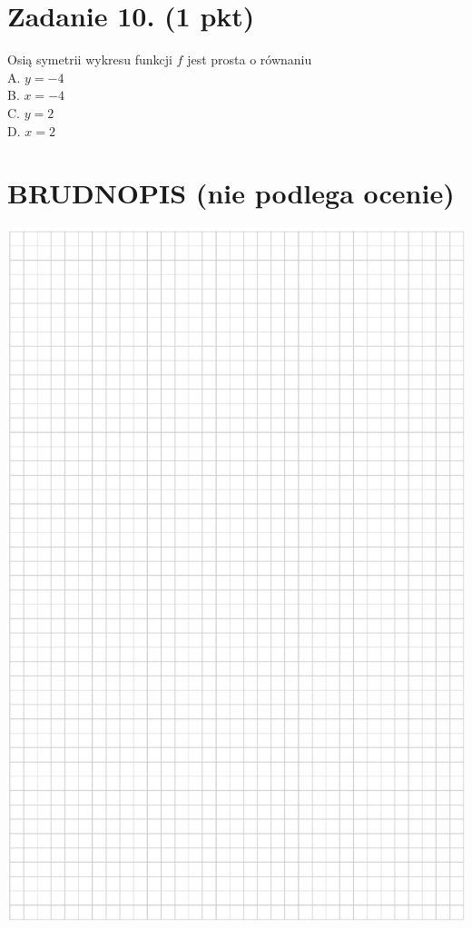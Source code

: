 \documentclass[10pt]{article}
\begin{document}
\section*{Zadanie 10. (1 pkt)}
Osią symetrii wykresu funkcji \(f\) jest prosta o równaniu\\
A. \(y=-4\)\\
B. \(x=-4\)\\
C. \(y=2\)\\
D. \(x=2\)

\section*{BRUDNOPIS (nie podlega ocenie)}
\begin{center}
\includegraphics[max width=\textwidth]{2024_11_21_d51d653f4fe4a5bb0c33g-05}
\end{center}
\end{document}
